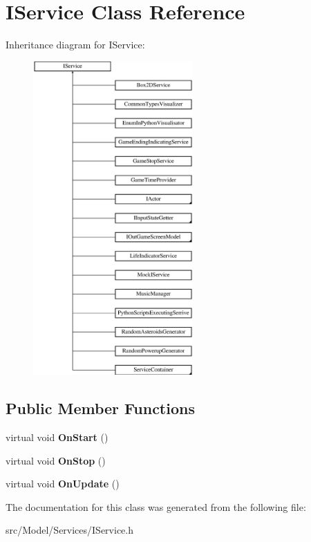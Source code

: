 \hypertarget{classIService}{}\section{I\+Service Class Reference}
\label{classIService}
Inheritance diagram for I\+Service\+:\begin{figure}[H]
\begin{center}
\leavevmode
\includegraphics[height=12.000000cm]{classIService}
\end{center}
\end{figure}
\subsection*{Public Member Functions}
\begin{DoxyCompactItemize}
\item 
virtual void {\bfseries On\+Start} ()\hypertarget{classIService_a979d6512b8275bccaf2b2a08950f6547}{}\label{classIService_a979d6512b8275bccaf2b2a08950f6547}

\item 
virtual void {\bfseries On\+Stop} ()\hypertarget{classIService_a2ecf2608d47d0b5a329d155460027c7c}{}\label{classIService_a2ecf2608d47d0b5a329d155460027c7c}

\item 
virtual void {\bfseries On\+Update} ()\hypertarget{classIService_ad0325a9954a8afc890ea6f36f0e12699}{}\label{classIService_ad0325a9954a8afc890ea6f36f0e12699}

\end{DoxyCompactItemize}


The documentation for this class was generated from the following file\+:\begin{DoxyCompactItemize}
\item 
src/\+Model/\+Services/I\+Service.\+h\end{DoxyCompactItemize}
